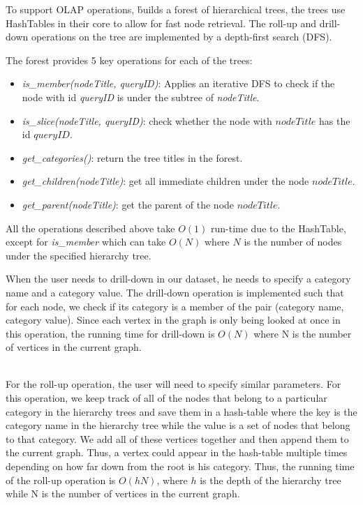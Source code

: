To support OLAP operations,
\h builds a forest of hierarchical trees, the trees use HashTables in their core to
allow for fast node retrieval. The roll-up and drill-down operations
on the tree are implemented by a depth-first search (DFS).

The forest provides 5 key operations for each of the trees:
\begin{itemize}
    \item \textit{is\_member(nodeTitle, queryID)}: Applies an iterative DFS to check if
    the node with id \textit{queryID} is under the subtree of \textit{nodeTitle}.
    \item \textit{is\_slice(nodeTitle, queryID)}: check whether the node with $nodeTitle$
    has the id $queryID$.
    \item \textit{get\_categories()}: return the tree titles in the forest.
    \item \textit{get\_children(nodeTitle)}: get all immediate children under the node
    $nodeTitle$.
    \item \textit{get\_parent(nodeTitle)}: get the parent of the node $nodeTitle$.
\end{itemize}

All the operations described above take $O(1)$ run-time due to the HashTable, except for
\textit{is\_member} which can take $O(N)$ where $N$ is the number of nodes under the specified
hierarchy tree.

When the user needs to drill-down in our dataset, he needs to specify a category name and a category
value. The drill-down operation is implemented such that for each node, we check if its category is a member
of the pair (category name, category value). Since each vertex in the graph is only being looked at once in this operation, the running time for drill-down is $O(N)$ where N is the number of vertices in the current graph.

\ \\

For the roll-up operation, the user will need to specify similar parameters.
For this operation, we keep track of all of the nodes that belong to a particular
category in the hierarchy trees and save them in a hash-table where the key is
the category name in the hierarchy tree while the value is a set of nodes that
belong to that category. We add all of these vertices together and then append them to the current graph. Thus, a vertex could appear in the hash-table multiple times depending on how far down from the root is his category. Thus, the running time of the roll-up operation is $O(hN)$, where $h$ is the depth of the hierarchy tree while N is the number of vertices in the current graph.

